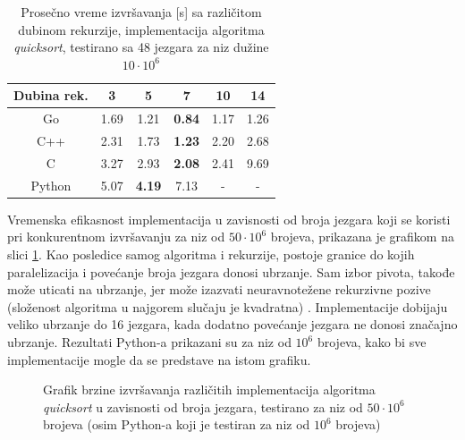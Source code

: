 \documentclass[12pt,oneside]{memoir}
\begin{document}
\begin{table}
\begin{center}
\caption{Prosečno vreme izvršavanja [s] sa različitom dubinom rekurzije, implementacija algoritma \textit{quicksort}, testirano sa 48 jezgara za niz dužine $10\cdot10^{6}$}
\begin{tabular}{||c||c c c c c||}
\hline
Dubina rek.&3 &5 &7 &10 &14 \\ \hline
Go		&1.69		&1.21			&\textbf{0.84}		&1.17		&1.26\\ \hline
C++ 	 	&2.31 	&1.73			&\textbf{1.23}		&2.20		&2.68\\ \hline
C		&3.27		&2.93			&\textbf{2.08}		&2.41		&9.69\\ \hline
Python 	&5.07		&\textbf{4.19}	&7.13				&-		&- 	\\
\hline
\end{tabular}
\label{tab:qs5}
\end{center}
\end{table}

Vremenska efikasnost implementacija u zavisnosti od broja jezgara koji se koristi pri konkurentnom izvršavanju za niz od $50\cdot10^{6}$ brojeva, prikazana je grafikom na slici \ref{fig:qs1}. Kao posledice samog algoritma i rekurzije, postoje granice do kojih paralelizacija i povećanje broja jezgara donosi ubrzanje. Sam izbor pivota, takođe može uticati na ubrzanje, jer može izazvati neuravnotežene rekurzivne pozive (složenost algoritma u najgorem slučaju je kvadratna) \cite{qsp}. Implementacije dobijaju veliko ubrzanje do 16 jezgara, kada dodatno povećanje jezgara ne donosi značajno ubrzanje. Rezultati Python-a prikazani su za niz od $10^{6}$  brojeva, kako bi sve implementacije mogle da se predstave na istom grafiku.

\begin{figure}
\begin{center}


\caption{Grafik brzine izvršavanja različitih implementacija algoritma \textit{quicksort} u zavisnosti od broja jezgara, testirano za niz od $50\cdot10^{6}$  brojeva (osim Python-a koji je testiran za niz od $10^{6}$ brojeva)}
\label{fig:qs1}
\end{center}
\end{figure}
\end{document}
